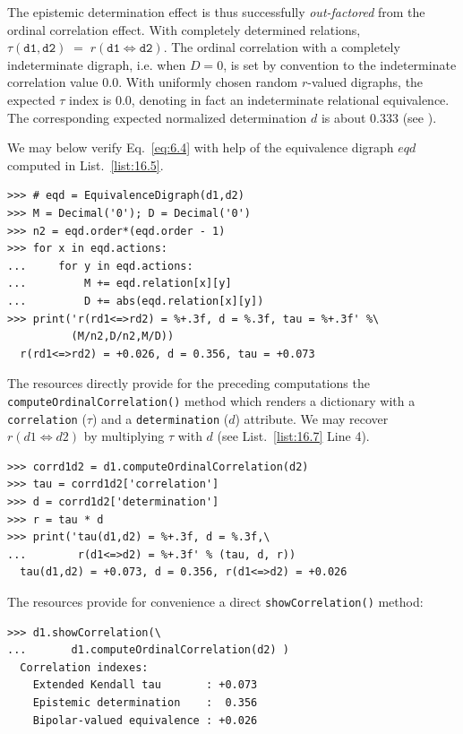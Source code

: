 The epistemic determination effect is thus successfully \emph{out-factored} from the ordinal correlation effect. With completely determined relations, $\tau(\mathtt{d1},\mathtt{d2}) \;=\; r(\mathtt{d1} \Leftrightarrow \mathtt{d2})$. The ordinal correlation with a completely indeterminate digraph, i.e. when $D = 0$, is set by convention to the indeterminate correlation value $0.0$. With uniformly chosen random $r$-valued digraphs, the expected $\tau$ index is $0.0$, denoting in fact an indeterminate relational equivalence. The corresponding expected normalized determination $d$ is about $0.333$ (see \citep{BIS-2012a}).

We may below verify Eq.~\vref{eq:6.4} with help of the equivalence digraph $eqd$ computed in List.~\vref{list:16.5}.
\begin{lstlisting}[caption={Computing the ordinal correlation index from the equivalence digraph},label=list:16.6]
>>> # eqd = EquivalenceDigraph(d1,d2)
>>> M = Decimal('0'); D = Decimal('0')
>>> n2 = eqd.order*(eqd.order - 1)
>>> for x in eqd.actions:
...     for y in eqd.actions:
...         M += eqd.relation[x][y]
...         D += abs(eqd.relation[x][y])
>>> print('r(rd1<=>rd2) = %+.3f, d = %.3f, tau = %+.3f' %\
          (M/n2,D/n2,M/D))   
  r(rd1<=>rd2) = +0.026, d = 0.356, tau = +0.073  
\end{lstlisting}

The \Digraph resources directly provide for the preceding computations the \texttt{compute\-OrdinalCorrelation()} method which renders a dictionary with a \texttt{correlation} ($\tau$) and a \texttt{determina\-tion} ($d$) attribute. We may recover $r(d1 \Leftrightarrow d2)$ by multiplying $\tau$ with $d$ (see List.~\vref{list:16.7} Line 4). 
\begin{lstlisting}[caption={Computing the valued ordinal correlation index},label=list:16.7]
>>> corrd1d2 = d1.computeOrdinalCorrelation(d2)
>>> tau = corrd1d2['correlation']
>>> d = corrd1d2['determination']
>>> r = tau * d
>>> print('tau(d1,d2) = %+.3f, d = %.3f,\
...        r(d1<=>d2) = %+.3f' % (tau, d, r))
  tau(d1,d2) = +0.073, d = 0.356, r(d1<=>d2) = +0.026
\end{lstlisting}

The \Digraph resources provide for convenience a direct \texttt{showCorrela\-tion()} method:
\begin{lstlisting}
>>> d1.showCorrelation(\
...       d1.computeOrdinalCorrelation(d2) )
  Correlation indexes:
    Extended Kendall tau       : +0.073
    Epistemic determination    :  0.356
    Bipolar-valued equivalence : +0.026
\end{lstlisting}

